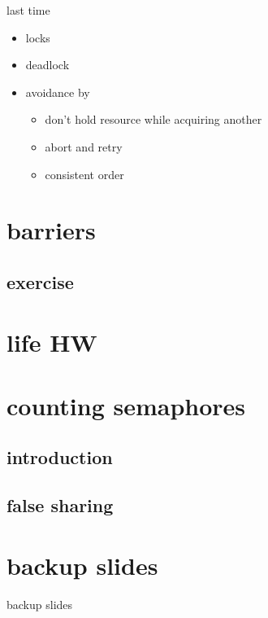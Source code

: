 \date{}
\title{}
\date{}

\begin{frame}
    \titlepage
\end{frame}



\begin{frame}{last time}
    \begin{itemize}
    \item locks
    \item deadlock
    \item avoidance by
        \begin{itemize}
        \item don't hold resource while acquiring another
        \item abort and retry
        \item consistent order
        \end{itemize}
    \end{itemize}
\end{frame}

\section{barriers}


\subsection{exercise}


\section{life HW}




\section{counting semaphores}
\subsection{introduction}



\subsection{false sharing}







\section{backup slides}
\begin{frame}{backup slides}
\end{frame}







